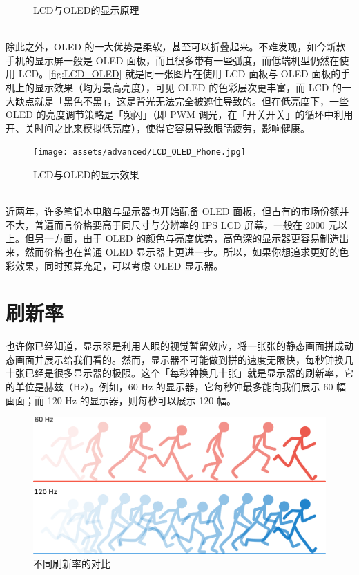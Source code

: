 \begin{itemize}
\begin{figure}[htb!]
      \caption{LCD与OLED的显示原理}
      \label{fig:LCD_OLED}
    \end{figure}\\
    除此之外，OLED 的一大优势是柔软，甚至可以折叠起来。不难发现，如今新款手机的显示屏一般是 OLED 面板，而且很多带有一些弧度，而低端机型仍然在使用 LCD。\autoref{fig:LCD_OLED} 就是同一张图片在使用 LCD 面板与 OLED 面板的手机上的显示效果（均为最高亮度），可见 OLED 的色彩层次更丰富，而 LCD 的一大缺点就是「黑色不黑」，这是背光无法完全被遮住导致的。但在低亮度下，一些 OLED 的亮度调节策略是「频闪」（即 PWM 调光，在「开关开关」的循环中利用开、关时间之比来模拟低亮度），使得它容易导致眼睛疲劳，影响健康。
    \begin{figure}[htb!]
      \centering
      \texttt{[image: assets/advanced/LCD\_OLED\_Phone.jpg]}
      \caption{LCD与OLED的显示效果}
      \label{fig:LCD_OLED_Phone}
    \end{figure}\\
    近两年，许多笔记本电脑与显示器也开始配备 OLED 面板，但占有的市场份额并不大，普遍而言价格要高于同尺寸与分辨率的 IPS LCD 屏幕，一般在 2000 元以上。但另一方面，由于 OLED 的颜色与亮度优势，高色深的显示器更容易制造出来，然而价格也在普通 OLED 显示器上更进一步。所以，如果你想追求更好的色彩效果，同时预算充足，可以考虑 OLED 显示器。
\end{itemize}

\section{刷新率}

也许你已经知道，显示器是利用人眼的视觉暂留效应，将一张张的静态画面拼成动态画面并展示给我们看的。然而，显示器不可能做到拼的速度无限快，每秒钟换几十张已经是很多显示器的极限。这个「每秒钟换几十张」就是显示器的刷新率，它的单位是赫兹（Hz）。例如，60 Hz 的显示器，它每秒钟最多能向我们展示 60 幅画面；而 120 Hz 的显示器，则每秒可以展示 120 幅。

\begin{figure}[htb!]
  \centering
  \includegraphics[width=.7\textwidth]{assets/advanced/Refresh_rates.pdf}
  \caption{不同刷新率的对比}
  \label{fig:Refresh_rates}
\end{figure}

